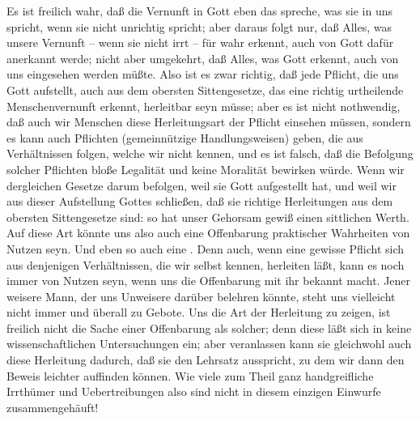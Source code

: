\begin{aufza}\setcounter{enumi}{1}
\item Es ist freilich wahr, daß die Vernunft in Gott eben das spreche, was sie in uns spricht, wenn sie nicht unrichtig spricht; aber daraus folgt nur, daß Alles, was unsere Vernunft -- wenn sie nicht irrt -- für wahr erkennt, auch von Gott dafür anerkannt werde; nicht aber umgekehrt, daß Alles, was Gott erkennt, auch von uns eingesehen werden müßte. Also ist es zwar richtig, daß jede Pflicht, die uns Gott aufstellt, auch aus dem obersten Sittengesetze, das eine richtig urtheilende Menschenvernunft erkennt, herleitbar seyn müsse; aber es ist nicht nothwendig, daß auch wir Menschen diese Herleitungsart der Pflicht einsehen müssen, sondern es kann auch Pflichten (gemeinnützige Handlungsweisen) geben, die aus Verhältnissen folgen, welche wir nicht kennen, und es ist falsch, daß die Befolgung solcher Pflichten bloße Legalität und keine Moralität bewirken würde. Wenn wir dergleichen Gesetze darum befolgen, weil sie Gott aufgestellt hat, und weil wir aus dieser Aufstellung Gottes schließen, daß sie richtige Herleitungen aus dem obersten Sittengesetze sind: so hat unser Gehorsam gewiß einen sittlichen Werth. Auf diese Art könnte uns also auch eine  Offenbarung praktischer Wahrheiten von Nutzen seyn. Und eben so auch eine . Denn auch, wenn eine gewisse Pflicht sich aus denjenigen Verhältnissen, die wir selbst kennen, herleiten läßt, kann es noch immer von Nutzen seyn, wenn uns die Offenbarung mit ihr bekannt macht. Jener weisere Mann, der uns Unweisere darüber belehren könnte, steht uns vielleicht nicht immer und überall zu Gebote. Uns die Art der Herleitung zu zeigen, ist freilich nicht die Sache einer Offenbarung als solcher; denn diese läßt sich in keine wissenschaftlichen Untersuchungen ein; aber veranlassen kann sie gleichwohl auch diese Herleitung dadurch, daß sie den Lehrsatz ausspricht, zu dem wir dann den Beweis leichter auffinden können. Wie viele zum Theil ganz handgreifliche Irrthümer und Uebertreibungen also sind nicht in diesem einzigen Einwurfe zusammengehäuft!
\end{aufza}

